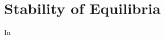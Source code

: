 \chapter{Stability of Equilibria}
\label{app:1}
In \textcite{benziStochasticResonanceClimatic1982} 
